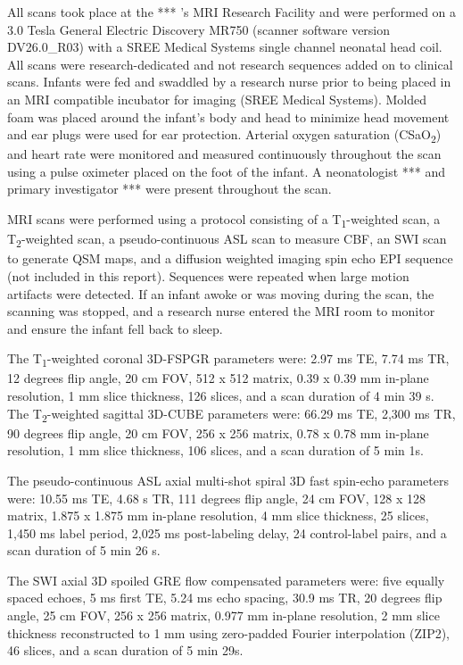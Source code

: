 \documentclass[
  letterpaper,
  DIV=11,
  numbers=noendperiod]{scrartcl}
\begin{document}
All scans took place at the *** 's MRI Research Facility and were
performed on a 3.0 Tesla General Electric Discovery MR750 (scanner
software version DV26.0\_R03) with a SREE Medical Systems single channel
neonatal head coil. All scans were research-dedicated and not research
sequences added on to clinical scans. Infants were fed and swaddled by a
research nurse prior to being placed in an MRI compatible incubator for
imaging (SREE Medical Systems). Molded foam was placed around the
infant's body and head to minimize head movement and ear plugs were used
for ear protection. Arterial oxygen saturation (CSaO\textsubscript{2})
and heart rate were monitored and measured continuously throughout the
scan using a pulse oximeter placed on the foot of the infant. A
neonatologist *** and primary investigator *** were present throughout
the scan.

MRI scans were performed using a protocol consisting of a
T\textsubscript{1}-weighted scan, a T\textsubscript{2}-weighted scan, a
pseudo-continuous ASL scan to measure CBF, an SWI scan to generate QSM
maps, and a diffusion weighted imaging spin echo EPI sequence (not
included in this report). Sequences were repeated when large motion
artifacts were detected. If an infant awoke or was moving during the
scan, the scanning was stopped, and a research nurse entered the MRI
room to monitor and ensure the infant fell back to sleep.

The T\textsubscript{1}-weighted coronal 3D-FSPGR parameters were: 2.97
ms TE, 7.74 ms TR, 12 degrees flip angle, 20 cm FOV, 512 x 512 matrix,
0.39 x 0.39 mm in-plane resolution, 1 mm slice thickness, 126 slices,
and a scan duration of 4 min 39 s. The T\textsubscript{2}-weighted
sagittal 3D-CUBE parameters were: 66.29 ms TE, 2,300 ms TR, 90 degrees
flip angle, 20 cm FOV, 256 x 256 matrix, 0.78 x 0.78 mm in-plane
resolution, 1 mm slice thickness, 106 slices, and a scan duration of 5
min 1s.

The pseudo-continuous ASL axial multi-shot spiral 3D fast spin-echo
parameters were: 10.55 ms TE, 4.68 s TR, 111 degrees flip angle, 24 cm
FOV, 128 x 128 matrix, 1.875 x 1.875 mm in-plane resolution, 4 mm slice
thickness, 25 slices, 1,450 ms label period, 2,025 ms post-labeling
delay, 24 control-label pairs, and a scan duration of 5 min 26 s.

The SWI axial 3D spoiled GRE flow compensated parameters were: five
equally spaced echoes, 5 ms first TE, 5.24 ms echo spacing, 30.9 ms TR,
20 degrees flip angle, 25 cm FOV, 256 x 256 matrix, 0.977 mm in-plane
resolution, 2 mm slice thickness reconstructed to 1 mm using zero-padded
Fourier interpolation (ZIP2), 46 slices, and a scan duration of 5 min
29s.
\end{document}

